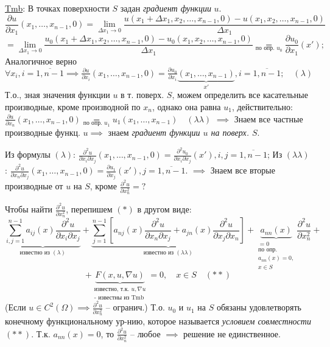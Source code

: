 \documentclass[12pt, a4paper]{article}
\begin{document}
\underline{Tmb}: В точках поверхности $S$ задан \textit{градиент функции} $u$.
\[
\frac{\partial u}{\partial x_1}(x_1, \dots, x_{n-1},0) = \lim_{\Delta x_1 \to 0} \frac{u(x_1+\Delta x_1, x_2, \dots, x_{n-1},0) - u(x_1, x_2, \dots, x_{n-1},0)}{\Delta x_1}
\]
\[
= \lim_{\Delta x_1 \to 0} \frac{u_0(x_1+\Delta x_1, x_2, \dots, x_{n-1},0) - u_0(x_1, x_2, \dots, x_{n-1},0)}{\Delta x_1} \underset{\text{по опр. } u_0}{=} \frac{\partial u_0}{\partial x_1}(x');
\]
Аналогичное верно $\forall x_i, i = \overline{1, n-1} \implies \frac{\partial u}{\partial x_i}(x_1, \dots, x_{n-1},0) = \frac{\partial u_0}{\partial x_i} \underbrace{(x_1, \dots, x_{n-1})}_{x'}, i=\overline{1,n-1}; \quad (\lambda) $
Т.о., зная значения функции $u$ в т. поверх. $S$, можем определить все касательные производные, кроме производной по $x_n$, однако она равна $u_1$, действительно:
$\frac{\partial u}{\partial x_n}(x_1, \dots, x_{n-1},0) \underset{\text{по опр. } u_1}{=} u_1(x_1, \dots, x_{n-1}) \quad (\lambda\lambda)$
$\implies$ Знаем все частные производные функц. $u \implies$ знаем \textit{градиент функции $u$ на поверх. $S$}.

Из формулы $(\lambda)$: $\frac{\partial^2 u}{\partial x_i \partial x_j}(x_1, \dots, x_{n-1},0) = \frac{\partial^2 u_0}{\partial x_i \partial x_j}(x'), i,j=\overline{1,n-1}$;
Из $(\lambda\lambda)$: $\frac{\partial^2 u}{\partial x_n \partial x_j}(x_1, \dots, x_{n-1},0) = \frac{\partial u_1}{\partial x_j}(x'), j=\overline{1,n-1}$.
$\implies$ Знаем все вторые производные от $u$ на $S$, кроме $\frac{\partial^2 u}{\partial x_n^2} = ?$

Чтобы найти $\frac{\partial^2 u}{\partial x_n^2}$, перепишем $(*)$ в другом виде:
\[
\underbrace{ \sum_{i,j=1}^{n-1} a_{ij}(x) \frac{\partial^2 u}{\partial x_i \partial x_j} }_{\text{известно из }(\lambda)} + \underbrace{ \sum_{j=1}^{n-1} \left[ a_{nj}(x) \frac{\partial^2 u}{\partial x_n \partial x_j} + a_{jn}(x) \frac{\partial^2 u}{\partial x_j \partial x_n} \right] }_{\text{известно из }(\lambda\lambda)} + \underbrace{a_{nn}(x)}_{\substack{=0 \\ \text{по опр.} \\ a_{nn}(x)=0, \\ x \in S}} \frac{\partial^2 u}{\partial x_n^2} +
\]
\[
+ \underbrace{F(x,u,\nabla u)}_{\substack{\text{известно, т.к. } u, \nabla u \\ \text{- известны из Tmb}}} = 0, \quad x \in S \quad (**)
\]
(Если $u \in C^2(\Omega) \implies \frac{\partial^2 u}{\partial x_n^2}$ -- огранич.)
Т.о. $u_0$ и $u_1$ на $S$ обязаны удовлетворять конечному функциональному ур-нию, которое называется \textit{условием совместности} $(**)$.
Т.к. $a_{nn}(x)=0$, то $\frac{\partial^2 u}{\partial x_n^2}$ -- любое $\implies$ решение не единственное.
\end{document}

